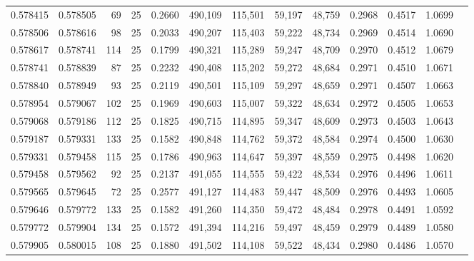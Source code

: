 \begin{tabular}{rrrrrrrrrrrrr}
0.578415 & 0.578505 &    69 &  25 &                                     0.2660 & 490,109 & 115,501 &  59,197 &  48,759 & 0.2968 & 0.4517 & 1.0699 \\
0.578506 & 0.578616 &    98 &  25 &                                     0.2033 & 490,207 & 115,403 &  59,222 &  48,734 & 0.2969 & 0.4514 & 1.0690 \\
0.578617 & 0.578741 &   114 &  25 &                                     0.1799 & 490,321 & 115,289 &  59,247 &  48,709 & 0.2970 & 0.4512 & 1.0679 \\
0.578741 & 0.578839 &    87 &  25 &                                     0.2232 & 490,408 & 115,202 &  59,272 &  48,684 & 0.2971 & 0.4510 & 1.0671 \\
0.578840 & 0.578949 &    93 &  25 &                                     0.2119 & 490,501 & 115,109 &  59,297 &  48,659 & 0.2971 & 0.4507 & 1.0663 \\
0.578954 & 0.579067 &   102 &  25 &                                     0.1969 & 490,603 & 115,007 &  59,322 &  48,634 & 0.2972 & 0.4505 & 1.0653 \\
0.579068 & 0.579186 &   112 &  25 &                                     0.1825 & 490,715 & 114,895 &  59,347 &  48,609 & 0.2973 & 0.4503 & 1.0643 \\
0.579187 & 0.579331 &   133 &  25 &                                     0.1582 & 490,848 & 114,762 &  59,372 &  48,584 & 0.2974 & 0.4500 & 1.0630 \\
0.579331 & 0.579458 &   115 &  25 &                                     0.1786 & 490,963 & 114,647 &  59,397 &  48,559 & 0.2975 & 0.4498 & 1.0620 \\
0.579458 & 0.579562 &    92 &  25 &                                     0.2137 & 491,055 & 114,555 &  59,422 &  48,534 & 0.2976 & 0.4496 & 1.0611 \\
0.579565 & 0.579645 &    72 &  25 &                                     0.2577 & 491,127 & 114,483 &  59,447 &  48,509 & 0.2976 & 0.4493 & 1.0605 \\
0.579646 & 0.579772 &   133 &  25 &                                     0.1582 & 491,260 & 114,350 &  59,472 &  48,484 & 0.2978 & 0.4491 & 1.0592 \\
0.579772 & 0.579904 &   134 &  25 &                                     0.1572 & 491,394 & 114,216 &  59,497 &  48,459 & 0.2979 & 0.4489 & 1.0580 \\
0.579905 & 0.580015 &   108 &  25 &                                     0.1880 & 491,502 & 114,108 &  59,522 &  48,434 & 0.2980 & 0.4486 & 1.0570 \\

\end{tabular}
